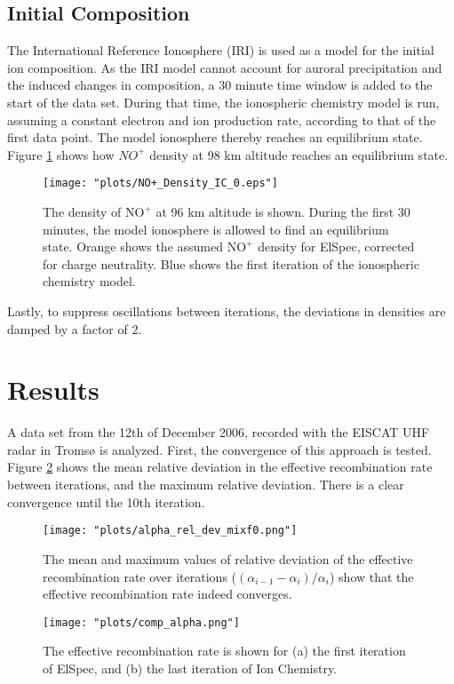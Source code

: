 \documentclass[10pt, a4paper]{article}
\numberwithin{equation}{section}										%
\begin{document}
\subsection{Initial Composition}
The International Reference Ionosphere (IRI) \cite{bilitza_international_2014} is used as a model for the initial ion composition. As the IRI model cannot account for auroral precipitation and the induced changes in composition, a 30 minute time window is added to the start of the data set. During that time, the ionospheric chemistry model is run, assuming a constant electron and ion production rate, according to that of the first data point. The model ionosphere thereby reaches an equilibrium state. Figure \ref{fig:dialin} shows how $NO^+$ density at 98 km altitude reaches an equilibrium state.


\begin{figure}
	\centering
	\texttt{[image: "plots/NO+\_Density\_IC\_0.eps"]}
	\caption{The density of $\mathrm{NO^+}$ at 96 km altitude is shown. During the first 30 minutes, the model ionosphere is allowed to find an equilibrium state. Orange shows the assumed $\mathrm{NO^+}$ density for ElSpec, corrected for charge neutrality. Blue shows the first iteration of the ionospheric chemistry model.}
	\label{fig:dialin}
\end{figure}
%

Lastly, to suppress oscillations between iterations, the deviations in densities are damped by a factor of 2.


\section{Results}
A data set from the 12th of December 2006, recorded with the EISCAT UHF radar in Tromsø is analyzed. First, the convergence of this approach is tested. Figure \ref{fig:convergence} shows the mean relative deviation in the effective recombination rate between iterations, and the maximum relative deviation. There is a clear convergence until the 10th iteration. 

\begin{figure}
	\centering
	\texttt{[image: "plots/alpha\_rel\_dev\_mixf0.png"]}
	\caption{The mean and maximum values of relative deviation of the effective recombination rate over iterations ($(\alpha_{i-1} - \alpha_{i})/\alpha_{i} $) show that the effective recombination rate indeed converges.}
	\label{fig:convergence}
\end{figure}
%
\par\medskip
%
\begin{figure}
	\centering
	\texttt{[image: "plots/comp\_alpha.png"]}
	\caption{The effective recombination rate is shown for (a) the first iteration of ElSpec, and (b) the last iteration of Ion Chemistry.}
	\label{fig:alpha}
\end{figure}
\end{document}
